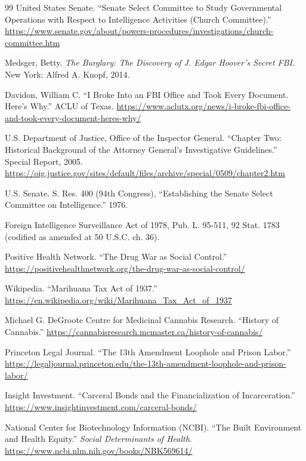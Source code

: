 \documentclass[12pt,openany]{book}
\begin{document}
\begin{thebibliography}{99}
United States Senate. ``Senate Select Committee to Study Governmental Operations with Respect to Intelligence Activities (Church Committee).'' \url{https://www.senate.gov/about/powers-procedures/investigations/church-committee.htm}

Medsger, Betty. \textit{The Burglary: The Discovery of J. Edgar Hoover's Secret FBI}. New York: Alfred A. Knopf, 2014.

Davidon, William C. ``I Broke Into an FBI Office and Took Every Document. Here's Why.'' ACLU of Texas. \url{https://www.aclutx.org/news/i-broke-fbi-office-and-took-every-document-heres-why/}

U.S. Department of Justice, Office of the Inspector General. ``Chapter Two: Historical Background of the Attorney General's Investigative Guidelines.'' Special Report, 2005. \url{https://oig.justice.gov/sites/default/files/archive/special/0509/chapter2.htm}

U.S. Senate. S. Res. 400 (94th Congress), ``Establishing the Senate Select Committee on Intelligence.'' 1976.

Foreign Intelligence Surveillance Act of 1978, Pub. L. 95-511, 92 Stat. 1783 (codified as amended at 50 U.S.C. ch. 36).


Positive Health Network. ``The Drug War as Social Control.'' \url{https://positivehealthnetwork.org/the-drug-war-as-social-control/}

Wikipedia. ``Marihuana Tax Act of 1937.'' \url{https://en.wikipedia.org/wiki/Marihuana_Tax_Act_of_1937}

Michael G. DeGroote Centre for Medicinal Cannabis Research. ``History of Cannabis.'' \url{https://cannabisresearch.mcmaster.ca/history-of-cannabis/}

Princeton Legal Journal. ``The 13th Amendment Loophole and Prison Labor.'' \url{https://legaljournal.princeton.edu/the-13th-amendment-loophole-and-prison-labor/}

Insight Investment. ``Carceral Bonds and the Financialization of Incarceration.'' \url{https://www.insightinvestment.com/carceral-bonds/}

National Center for Biotechnology Information (NCBI). ``The Built Environment and Health Equity.'' \textit{Social Determinants of Health}. \url{https://www.ncbi.nlm.nih.gov/books/NBK569614/}


\end{thebibliography}
\end{document}
